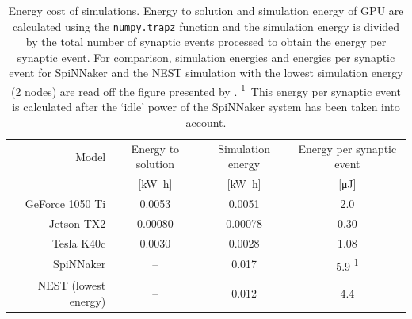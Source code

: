 \documentclass[utf8]{frontiersSCNS} %
\begin{document}
\begin{table}
  \centering
  \begin{tabular}{r S S S}
    \toprule
        {Model}                 & {Energy to solution}      & {Simulation energy}       & {Energy per synaptic event} \\
                                & {[\si{\kilo\watt\hour}]}  & {[\si{\kilo\watt\hour}]}  & {[\si{\micro\joule}]} \\
    \midrule
        GeForce 1050 Ti         & 0.0053                    & 0.0051                    & 2.0 \\
        Jetson TX2              & 0.00080                   & 0.00078                   & 0.30  \\
        Tesla K40c              & 0.0030                    & 0.0028                    & 1.08 \\
        SpiNNaker               & {--}                      & 0.017                     & 5.9 \textsuperscript{1}\\
        NEST (lowest energy)    & {--}                      & 0.012                     & 4.4 \\
    \bottomrule
  \end{tabular}

  \caption{Energy cost of simulations.
  Energy to solution and simulation energy of GPU are calculated using the \lstinline{numpy.trapz} function and the simulation energy is divided by the total number of synaptic events processed to obtain the energy per synaptic event.
  For comparison, simulation energies and energies per synaptic event for SpiNNaker and the NEST simulation with the lowest simulation energy (2 nodes) are read off the figure presented by \citet{VanAlbada2018}.
  \textsuperscript{1}~This energy per synaptic event is calculated after the `idle' power of the SpiNNaker system has been taken into account.}
  \label{tab:energy_measures}
\end{table}
\end{document}
